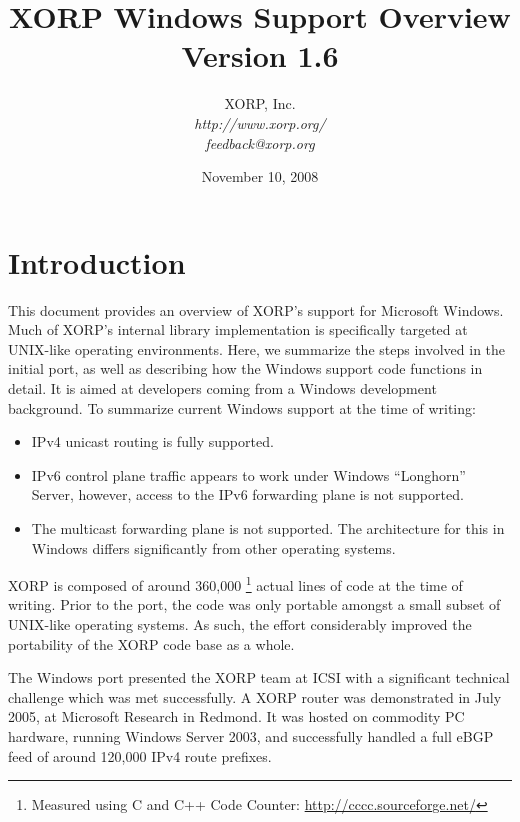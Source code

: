 \documentclass[11pt]{article}
\begin{document}
\title{XORP Windows Support Overview \\
\vspace{1ex}
Version 1.6}
\author{ XORP, Inc.					\\
         {\it http://www.xorp.org/}			\\
	 {\it feedback@xorp.org}
}
\date{November 10, 2008}

\maketitle


\section{Introduction}

This document provides an overview of XORP's support for Microsoft Windows.
Much of XORP's internal library implementation is specifically targeted
at UNIX-like operating environments. Here, we summarize the steps involved
in the initial port, as well as describing how the Windows support code
functions in detail. It is aimed at developers coming from a Windows
development background.
To summarize current Windows support at the time of writing:
\begin{itemize}
 \item IPv4 unicast routing is fully supported.
 \item IPv6 control plane traffic appears to work under Windows
``Longhorn'' Server, however, access to the IPv6 forwarding plane
is not supported.
 \item The multicast forwarding plane is not supported. The architecture
for this in Windows differs significantly from other operating systems.
\end{itemize}

XORP is composed of around 360,000
\footnote{Measured using C and C++ Code Counter: \url{http://cccc.sourceforge.net/}}
actual lines of code at the time of writing.
Prior to the port, the code was only portable amongst
a small subset of UNIX-like operating systems. As such, the effort
considerably improved the portability of the XORP code base as a whole.

The Windows port presented the XORP team at ICSI with a significant technical
challenge which was met successfully.
A XORP router  was
demonstrated in July 2005, at Microsoft Research in Redmond.
It was hosted on commodity PC hardware, running Windows Server 2003,
and successfully handled a full eBGP feed of around 120,000 IPv4 route prefixes.
\end{document}
